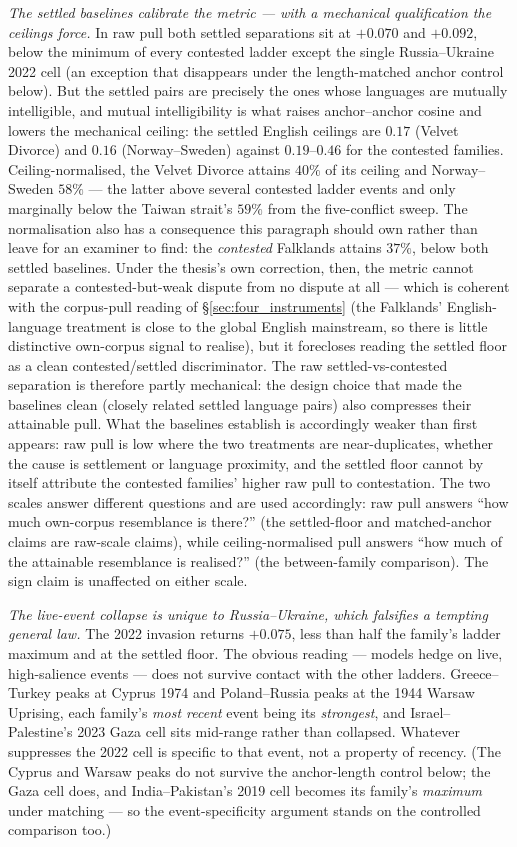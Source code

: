 \emph{The settled baselines calibrate the metric --- with a
mechanical qualification the ceilings force.} In raw pull both
settled separations sit at $+0.070$ and $+0.092$, below the minimum
of every contested ladder except the single Russia--Ukraine 2022
cell (an exception that disappears under the length-matched anchor
control below). But the settled pairs are precisely the ones whose
languages are mutually intelligible, and mutual intelligibility is
what raises anchor--anchor cosine and lowers the mechanical
ceiling: the settled English ceilings are $0.17$ (Velvet Divorce)
and $0.16$ (Norway--Sweden) against $0.19$--$0.46$ for the
contested families. Ceiling-normalised, the Velvet Divorce attains
$40\%$ of its ceiling and Norway--Sweden $58\%$ --- the latter
above several contested ladder events and only marginally below
the Taiwan strait's $59\%$ from the five-conflict sweep. The
normalisation also has a consequence this paragraph should own
rather than leave for an examiner to find: the \emph{contested}
Falklands attains $37\%$, below both settled baselines. Under the
thesis's own correction, then, the metric cannot separate a
contested-but-weak dispute from no dispute at all --- which is
coherent with the corpus-pull reading of
\S\ref{sec:four_instruments} (the Falklands' English-language
treatment is close to the global English mainstream, so there is
little distinctive own-corpus signal to realise), but it forecloses
reading the settled floor as a clean contested/settled
discriminator. The raw settled-vs-contested separation is
therefore partly mechanical: the design choice that made the
baselines clean (closely related settled language pairs) also
compresses their attainable pull. What the baselines establish is
accordingly weaker than first appears: raw pull is low where the
two treatments are near-duplicates, whether the cause is
settlement or language proximity, and the settled floor cannot by
itself attribute the contested families' higher raw pull to
contestation. The two scales answer different questions and are
used accordingly: raw pull answers ``how much own-corpus
resemblance is there?'' (the settled-floor and matched-anchor
claims are raw-scale claims), while ceiling-normalised pull
answers ``how much of the attainable resemblance is realised?''
(the between-family comparison). The sign claim is unaffected
on either scale.

\emph{The live-event collapse is unique to Russia--Ukraine, which
falsifies a tempting general law.} The 2022 invasion returns
$+0.075$, less than half the family's ladder maximum and at the
settled floor. The obvious reading --- models hedge on live,
high-salience events --- does not survive contact with the other
ladders. Greece--Turkey peaks at Cyprus 1974 and Poland--Russia
peaks at the 1944 Warsaw Uprising, each family's \emph{most recent}
event being its \emph{strongest}, and Israel--Palestine's 2023 Gaza
cell sits mid-range rather than collapsed. Whatever suppresses the
2022 cell is specific to that event, not a property of recency. (The
Cyprus and Warsaw peaks do not survive the anchor-length control
below; the Gaza cell does, and India--Pakistan's 2019 cell becomes
its family's \emph{maximum} under matching --- so the
event-specificity argument stands on the controlled comparison too.)

